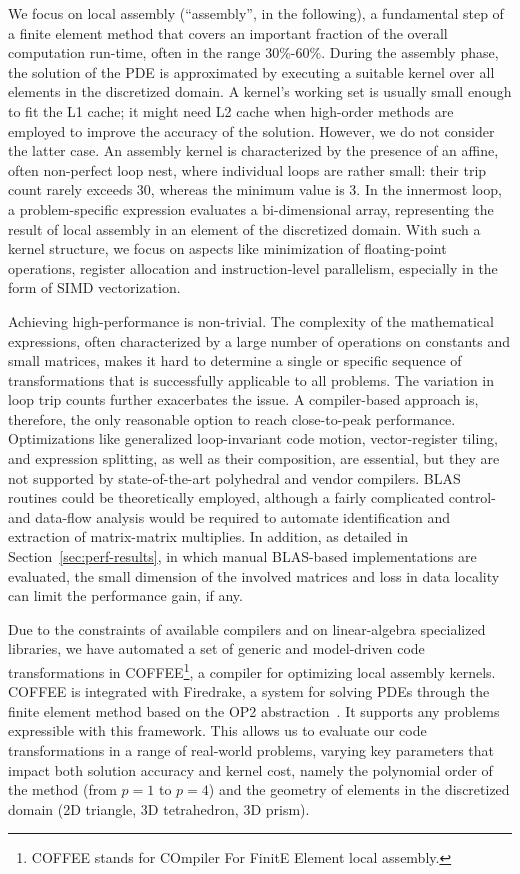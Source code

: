\documentclass[conference]{IEEEtran}
\begin{document}
We focus on local assembly (``assembly'', in the following), a fundamental step of a finite element method that covers an important fraction of the overall computation run-time, often in the range 30$\%$-60$\%$. During the assembly phase, the solution of the PDE is approximated by executing a suitable kernel over all elements in the discretized domain. A kernel's working set is usually small enough to fit the L1 cache; it might need L2 cache when high-order methods are employed to improve the accuracy of the solution. However, we do not consider the latter case. An assembly kernel is characterized by the presence of an affine, often non-perfect loop nest, where individual loops are rather small: their trip count rarely exceeds 30, whereas the minimum value is 3. In the innermost loop, a problem-specific expression evaluates a bi-dimensional array, representing the result of local assembly in an element of the discretized domain. With such a kernel structure, we focus on aspects like minimization of floating-point operations, register allocation and instruction-level parallelism, especially in the form of SIMD vectorization. 

Achieving high-performance is non-trivial. The complexity of the mathematical expressions, often characterized by a large number of operations on constants and small matrices, makes it hard to determine a single or specific sequence of transformations that is successfully applicable to all problems. The variation in loop trip counts further exacerbates the issue. A compiler-based approach is, therefore, the only reasonable option to reach close-to-peak performance. Optimizations like generalized loop-invariant code motion, vector-register tiling, and expression splitting, as well as their composition, are essential, but they are not supported by state-of-the-art polyhedral and vendor compilers. BLAS routines could be theoretically employed, although a fairly complicated control- and data-flow analysis would be required to automate identification and extraction of matrix-matrix multiplies. In addition, as detailed in Section~\ref{sec:perf-results}, in which manual BLAS-based implementations are evaluated, the small dimension of the involved matrices and loss in data locality can limit the performance gain, if any.

Due to the constraints of available compilers and on linear-algebra specialized libraries, we have automated a set of generic and model-driven code transformations in COFFEE\footnote{COFFEE stands for COmpiler For FinitE Element local assembly.}, a compiler for optimizing local assembly kernels. COFFEE is integrated with Firedrake, a system for solving PDEs through the finite element method based on the OP2 abstraction~\cite{firedrake-code}. It supports any problems expressible with this framework. This allows us to evaluate our code transformations in a range of real-world problems, varying key parameters that impact both solution accuracy and kernel cost, namely the polynomial order of the method (from $p=1$ to $p=4$) and the geometry of elements in the discretized domain (2D triangle, 3D tetrahedron, 3D prism). 
\end{document}

